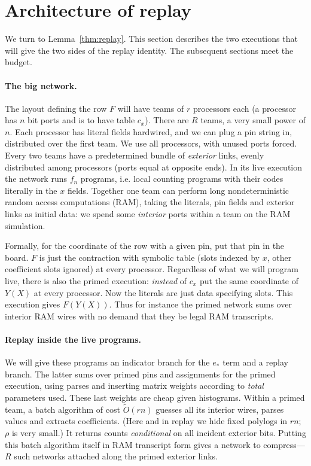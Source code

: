 \documentclass[11pt,letterpaper]{article}
\theoremstyle{definition}
\numberwithin{equation}{section}
\begin{document}
\section{Architecture of replay}\label{sec:replay}

We turn to Lemma~\ref{thm:replay}. This section describes the two executions that will give the two
sides of the replay identity. The subsequent sections meet the budget.

\paragraph{The big network.}
The layout defining the row $F$ will have teams of $r$ processors each (a
processor has $n$ bit ports and is to have table $c_x$). There are $R$ teams, a very small power of
$n$. Each processor has literal fields hardwired, and we can plug a pin string in, distributed
over the first team. We use all processors, with unused ports forced. Every two teams have
a predetermined bundle of \emph{exterior} links, evenly distributed among processors (ports equal
at opposite ends). In its live execution the network runs $f_n$ programs, i.e. local counting
programs with their codes literally in the $x$ fields. Together one team can perform long
nondeterministic random access computations (RAM), taking the literals, pin fields and
exterior links as initial data: we spend some \emph{interior} ports within a team on the RAM
simulation.

Formally, for the coordinate of the row with a given pin, put that pin in the board. $F$ is
just the contraction with symbolic table (slots indexed by $x$, other coefficient slots ignored) at
every processor. Regardless of what we will program live, there is also the primed execution:
\emph{instead} of $c_x$ put the same coordinate of $Y(X)$ at every processor. Now the literals are just
data specifying slots. This execution gives $F(Y(X))$. Thus for instance the primed network
sums over interior RAM wires with no demand that they be legal RAM transcripts.

\paragraph{Replay inside the live programs.}
We will give these programs an indicator branch
for the $e_\ast$ term and a replay branch. The latter sums over primed pins and assignments
for the primed execution, using parses and inserting matrix weights according to \emph{total}
parameters used. These last weights are cheap given histograms. Within a primed team,
a batch algorithm of cost $\widetilde{O}(rn)$ guesses all its interior wires, parses values and extracts
coefficients. (Here and in replay we hide fixed polylogs in $rn$; $\rho$ is very small.) It returns
counts \emph{conditional} on all incident exterior bits. Putting this batch algorithm itself in RAM
transcript form gives a network to compress---$R$ such networks attached along the primed
exterior links.
\end{document}
